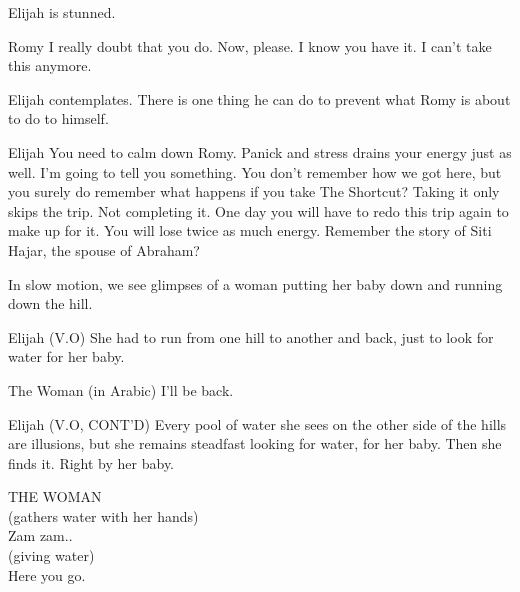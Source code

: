 \documentclass{screenplay}
\begin{document}
Elijah is stunned.

\begin{dialogue}{Romy}
    I really doubt that you do. Now, please. I know you have it. I can't take this anymore.
\end{dialogue}

Elijah contemplates. There is one thing he can do to prevent what Romy is about to do to himself.

\begin{dialogue}{Elijah}
    You need to calm down Romy. Panick and stress drains your energy just as well. I'm going to tell you something. You don't remember how we got here, but you surely do remember what happens if you take The Shortcut? Taking it only skips the trip. Not completing it. One day you will have to redo this trip again to make up for it. You will lose twice as much energy. Remember the story of Siti Hajar, the spouse of Abraham?
\end{dialogue}


In slow motion, we see glimpses of a woman putting her baby down and running down the hill.

\begin{dialogue}{Elijah (V.O)}
    She had to run from one hill to another and back, just to look for water for her baby.
\end{dialogue}

\begin{dialogue}{The Woman (in Arabic)}
    I'll be back.
\end{dialogue}

\begin{dialogue}{Elijah (V.O, CONT'D)}
    Every pool of water she sees on the other side of the hills are illusions, but she remains steadfast looking for water, for her baby. Then she finds it. Right by her baby.
\end{dialogue}

{
    {\hspace{2.7in}THE WOMAN\hspace{3.3in}}
    \\
    (gathers water with her hands)
    \\
    Zam zam..
    \\
    (giving water)
    \\
    Here you go.

}
\end{document}
